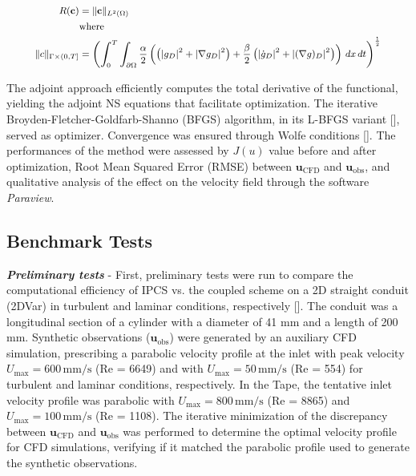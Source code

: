 \begin{equation}
\small
    \begin{aligned}
        R(\mathbf{c}) &= \| \mathbf{c} \|_{L^2(\Omega)} \\
        &\text{where} \\
        \small
        \|c\|_{\Gamma \times (0, T]} &= \left( \int_0^T \int_{\partial \Omega} \frac{\alpha}{2} \left( \left(|g_D|^2 + |\nabla g_D|^2 \right) + \frac{\beta}{2} \left( |\dot{g}_D|^2 +  |(\nabla g)_D|^2 \right) \right) \, dx \, dt \right)^{\frac{1}{2}}
    \end{aligned}
    \label{eq:11} 
\end{equation}

The adjoint approach efficiently computes the total derivative of the functional, yielding the adjoint NS equations that facilitate optimization. The iterative Broyden-Fletcher-Goldfarb-Shanno (BFGS) algorithm, in its L-BFGS variant [\cite{Liu1989}], served as optimizer. Convergence was ensured through Wolfe conditions [\cite{Nocedal2006}]. 
The performances of the method were assessed by   $J(u)$ value before and after optimization, Root Mean Squared Error (RMSE) between \( \mathbf{u}_{\text{CFD}} \) and \( \mathbf{u}_{\text{obs}} \), and qualitative analysis of the effect on the velocity field through the software \emph{Paraview}.

\subsection*{Benchmark Tests}
\label{sec:bench}
\textbf{\textit{Preliminary tests}} - First, preliminary tests were run to compare the computational efficiency of IPCS vs. the coupled scheme on a 2D straight conduit (2DVar) in turbulent and laminar conditions, respectively [\cite{Hale1955}]. The conduit was a longitudinal section of a cylinder with a diameter of 41 mm and a length of 200 mm. Synthetic observations (\( \mathbf{u}_{\text{obs}} \)) were generated by an auxiliary CFD simulation, prescribing a parabolic velocity profile at the inlet with peak velocity \( U_{\text{max}} = 600 \, \text{mm/s} \) (Re = 6649) and with \( U_{\text{max}} = 50 \, \text{mm/s} \) (Re = 554) for turbulent and laminar conditions, respectively.
In the Tape, the tentative inlet velocity profile was parabolic with \( U_{\text{max}} = 800 \, \text{mm/s} \) (Re = 8865) and \( U_{\text{max}} = 100 \, \text{mm/s} \) (Re = 1108).
The iterative minimization of the discrepancy between \( \mathbf{u}_{\text{CFD}} \) and \( \mathbf{u}_{\text{obs}} \) was performed to determine the optimal velocity profile for CFD simulations, verifying if it matched the parabolic profile used to generate the synthetic observations.\\

